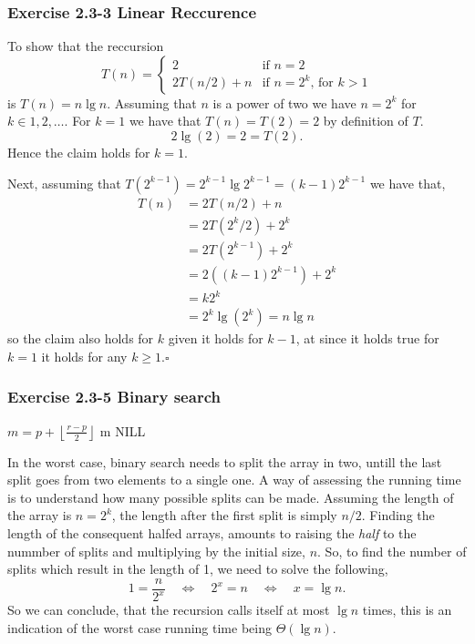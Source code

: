 \documentclass{article}
\let\oldReturn\Return
\renewcommand{\Return}{\State\oldReturn}
\providecommand{\floor}[1]{\left \lfloor #1 \right \rfloor }
\begin{document}
\subsubsection*{Exercise 2.3-3 Linear Reccurence}

To show that the reccursion 
\begin{equation*}
T(n) = \begin{cases}
2 &           \text{if $n=2$}\\
2T(n/2) + n & \text{if $n=2^k$, for $k>1$}
\end{cases} 
\end{equation*}
is $T(n)=n \lg n$. Assuming that $n$ is a power of two we have $n=2^k$ for $k\in{1,2,\ldots}$. For $k=1$ we have that $T(n)=T(2)=2$ by definition of $T$.  
\[
2 \lg(2) = 2 = T(2).
\]
Hence the claim holds for $k=1$.

Next, assuming that $T(2^{k-1})= 2^{k-1}\lg 2^{k-1} = (k-1)2^{k-1}$ we have that,
\begin{equation*}
\begin{split}
T(n)   & = 2T(n/2) + n \\
       & = 2T(2^k/2) + 2^k \\
       & = 2T(2^{k-1}) + 2^k \\
       & = 2((k-1)2^{k-1}) + 2^k \\
       & = k2^k \\
       & = 2^k \lg(2^k) = n \lg n
\end{split}
\end{equation*}
so the claim also holds for $k$ given it holds for $k-1$, at since it holds true for $k=1$ it holds for any $k\geq1$.\hfill $\square$

\subsubsection*{Exercise 2.3-5 Binary search}

\begin{algorithmic}[1]
	\State $m=p + \floor{\frac{r - p}{2}}$
		\Return m
		\Return {}
		\Return {}
	\EndIf
\EndIf
\Return NILL
\EndProcedure
\end{algorithmic}

In the worst case, binary search needs to split the array in two, untill the last split goes from two elements to a single one. A way of assessing the running time is to understand how many possible splits can be made. Assuming the length of the array is $n=2^k$, the length after the first split is simply $n/2$. Finding the length of the consequent halfed arrays, amounts to raising the \emph{half} to the nummber of splits and multiplying by the initial size, $n$. So, to find the number of splits which result in the length of 1, we need to solve the following,
\[
1 = \frac{n}{2^x} \quad\Leftrightarrow\quad 2^x = n \quad\Leftrightarrow\quad x = \lg n. 
\]
So we can conclude, that the recursion calls itself at most  $\lg n$ times, this is an indication of the worst case running time being $\Theta(\lg n)$.
\end{document}
